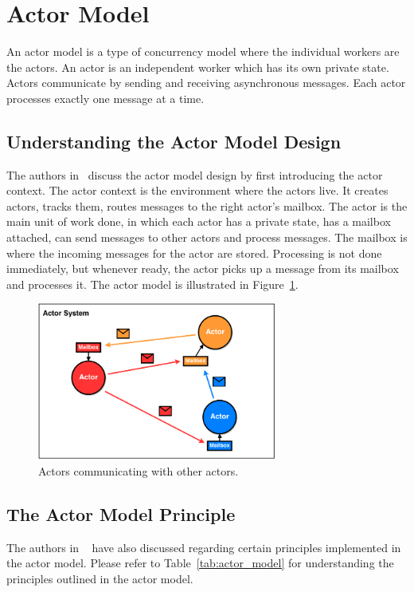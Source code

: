 \section{Actor Model\label{sec:actor}}
An actor model is a type of concurrency model where the individual workers are the actors. An actor is an independent worker which has its own private state. Actors communicate by sending and receiving asynchronous messages. Each actor processes exactly one message at a time.

\subsection{Understanding the Actor Model Design}
The authors in~\cite{8316391} discuss the actor model design by first introducing the actor context. The actor context is the environment where the actors live. It creates actors, tracks them, routes messages to the right actor's mailbox.  The actor is the main unit of work done, in which each actor has a private state, has a mailbox attached, can send messages to other actors and process messages. The mailbox is where the incoming messages for the actor are stored. Processing is not done immediately, but whenever ready, the actor picks up a message from its mailbox and processes it. 
The actor model is illustrated in Figure~\ref{fig:actor}. 
\begin{figure}[H]
    \centering
    \includegraphics[width=0.7\textwidth]{actor.png}
    \caption{Actors communicating with other actors.}
    \label{fig:actor}
\end{figure}
\subsection{The Actor Model Principle}
The authors in ~\cite{8316391} have also discussed regarding certain principles implemented in the actor model. Please refer to Table~\ref{tab:actor_model} for understanding the principles outlined in the actor model.

